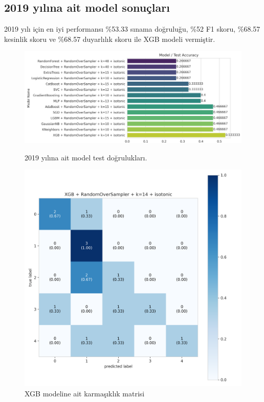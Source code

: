 \newpage

\subsection{2019 yılına ait model sonuçları}
2019 yılı için en iyi performansı \%53.33 sınama doğruluğu,  \%52 F1 skoru, \%68.57 kesinlik skoru ve \%68.57 duyarlılık skoru ile XGB modeli vermiştir.

\begin{figure}[ht]
\centering
\begin{minipage}[b]{0.6\textwidth}
    \centering
    \includegraphics[width=\textwidth]{2019.png}
    \caption{2019 yılına ait model test doğrulukları.}
    \label{fig:resim1}
\end{minipage}
\hfill
\begin{minipage}[b]{0.6\textwidth}
    \centering
    \includegraphics[width=\textwidth]{2019_cm.png}
    \caption{XGB modeline ait karmaşıklık matrisi}
    \label{fig:resim2}
\end{minipage}
\end{figure}

